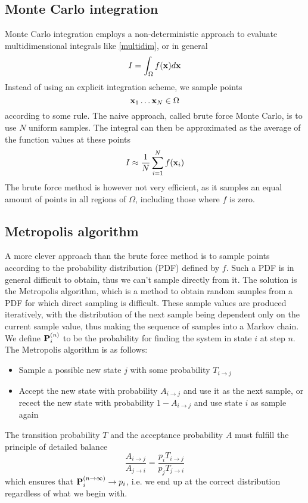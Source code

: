 \documentclass[english, a4paper]{article}
\begin{document}
\subsection*{Monte Carlo integration}

Monte Carlo integration employs a non-deterministic approach to evaluate multidimensional integrals like \eqref{multidim}, or
in general
\begin{equation}
 I = \int_\Omega f({\bf x}) d{\bf x}
\end{equation}
Instead of using an explicit integration scheme, we sample points
\begin{equation}
 {\bf x}_1 \dots {\bf x}_N \in \Omega
\end{equation}
according to some rule. The naive approach, called brute force Monte Carlo, is to use $N$ uniform samples. 
The integral can then be approximated as the average of the function values at these points
\begin{equation}
 I \approx \frac{1}{N} \sum_{i=1}^N f({\bf x}_i)
\end{equation}
The brute force method is however not very efficient, as it samples an equal amount of points in all regions of $\Omega$, 
including those where $f$ is zero. 

\subsection*{Metropolis algorithm}

A more clever approach than the brute force method is to sample points according to the probability distribution (PDF)
defined by $f$. Such a PDF is in general difficult to obtain, thus we can't sample directly from it.
The solution is the Metropolis algorithm, which is a method to obtain random samples from a PDF for which 
direct sampling is difficult. 
These sample values are produced iteratively, with the distribution of the next sample being dependent only on 
the current sample value, thus making the sequence of samples into a Markov chain.
We define ${\bf P}_i^{(n)}$ to be the 
probability for finding the system in state $i$ at step $n$. 
The Metropolis algorithm is as follows:
\begin{itemize}
 \item Sample a possible new state $j$ with some probability $T_{i\rightarrow j}$
 \item Accept the new state with probability $A_{i\rightarrow j}$ and use it as the next sample, or
 recect the new state with probability $1 - A_{i\rightarrow j}$ and use state $i$ as sample again
\end{itemize}
The transition probability $T$ and the acceptance probability $A$ must fulfill the principle of detailed balance
\begin{equation}
 \frac{A_{i\rightarrow j}}{A_{j\rightarrow i}} = \frac{p_i T_{i\rightarrow j}}{p_j T_{j\rightarrow i}}
 \label{detailedbalance}
\end{equation}
which ensures that ${\bf P}_i^{(n\rightarrow \infty)} \rightarrow p_i$, i.e. we end up at the correct 
distribution regardless of what we begin with. \\
\end{document}
